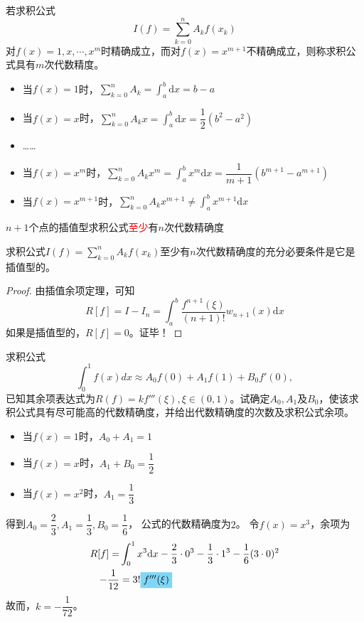 \begin{definition}[求积公式的代数精确度]
    若求积公式
    \[
        I(f) = \sum\limits_{k = 0}^{n}A_{k}f(x_k)
    \]
    对$f(x) = 1,x,\cdots,x^m$时精确成立，而对$f(x) = x^{m+1}$不精确成立，则称求积公式具有$m$次代数精度。
    \begin{itemize}
        \item 当$f(x) = 1$时，$\sum\limits_{k = 0}^{n}A_{k} = \int_{a}^{b}\mathrm{d}x = b-a$
        \item 当$f(x) = x$时，$\sum\limits_{k = 0}^{n}A_{k}x = \int_{a}^{b}\mathrm{d}x = \dfrac{1}{2}(b^2-a^2)$
        \item ……
        \item 当$f(x) = x^m$时，$\sum\limits_{k = 0}^{n}A_{k}x^m = \int_{a}^{b}x^m \mathrm{d}x = \dfrac{1}{m+1}(b^{m+1}-a^{m+1})$
        \item 当$f(x) = x^{m+1}$时，$\sum\limits_{k = 0}^{n}A_{k}x^{m+1} \neq \int_{a}^{b}x^{m+1}\mathrm{d}x$
    \end{itemize}
    \colorbox{cyan!50}{$n+1$个点的插值型求积公式\textcolor{red}{至少}有$n$次代数精确度}
\end{definition}
\begin{theorem}
    求积公式$I(f) = \sum\limits_{k = 0}^{n}A_{k}f(x_k)$至少有$n$次代数精确度的充分必要条件是它是插值型的。
\end{theorem}
\begin{proof}
    由插值余项定理，可知
    \[
        R[f] = I-I_n = \int_{a}^{b}\dfrac{f^{n+1}(\xi)}{(n+1)!}w_{n+1}(x)\mathrm{d}x
    \]
    如果是插值型的，$R[f] = 0$。证毕！
\end{proof}
\begin{example}
    求积公式
    \[
        \int_0^1f(x)dx\approx A_0f(0)+A_1f(1)+B_0f'(0),
    \]
    已知其余项表达式为$R(f)= kf'''(\xi),\xi\in (0,1)$。试确定$A_0,A_1$及$B_0$，使该求积公式具有尽可能高的代数精确度，并给出代数精确度的次数及求积公式余项。
    \begin{solution}
        \begin{itemize}
            \item 当$f(x) = 1$时，$A_0+A_1 = 1$
            \item 当$f(x) = x$时，$A_1+B_0 = \dfrac{1}{2}$
            \item 当$f(x) = x^2$时，$A_1 = \dfrac{1}{3}$
        \end{itemize}
        得到$A_0 = \dfrac{2}{3},A_1 = \dfrac{1}{3},B_0 = \dfrac{1}{6}$，
        公式的代数精确度为$2$。
        \newline 
        令$f(x) = x^3$，余项为
        \[
            \begin{aligned}
                R[f] =& \int_{0}^1 x^3\mathrm{d}x-\dfrac{2}{3}\cdot 0^3-\dfrac{1}{3}\cdot 1^3-\dfrac{1}{6}(3\cdot 0)^2\\
                -\dfrac{1}{12}&=3!\colorbox{cyan!50}{$f'''(\xi)$}
            \end{aligned}
        \]
        故而，$k = -\dfrac{1}{72}$。
    \end{solution}
\end{example}
